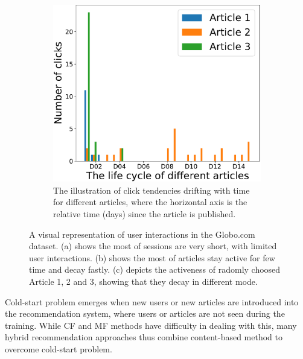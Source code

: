 \begin{figure}[th]
\begin{subfigure}[t]{0.3\textwidth}
    \end{subfigure}
    \qquad
    \begin{subfigure}[t]{0.3\textwidth}
        \includegraphics[height=0.8\textwidth]{fig/data_distribution_c.pdf}
        \caption{The illustration of click tendencies drifting with time for different articles, where the horizontal axis is the relative time (days) since the article is published.}
    \end{subfigure}
    \caption{A visual representation of user interactions in the Globo.com dataset. (a) shows the most of sessions are very short, with limited user interactions. (b) shows the most of articles stay active for few time and decay fastly. (c) depicts the activeness of radomly choosed Article 1, 2 and 3, showing that they decay in different mode.}
    \label{fig:data_distribution}
\end{figure}

Cold-start problem emerges when new users or new articles are introduced into the recommendation system, where users or articles are not seen during the training. While CF and MF methods have difficulty in dealing with this, many hybrid recommendation approaches thus combine content-based method to overcome cold-start problem. 

